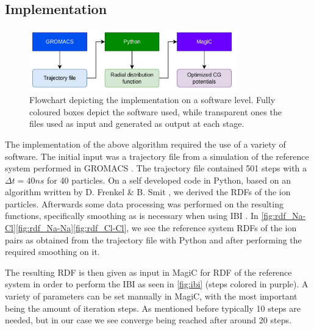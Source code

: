 \documentclass[10pt]{article}
\begin{document}
        
        
    \subsection{Implementation}
        \label{implementation}

                \begin{figure}[H]
                    \centering
                    \includegraphics[width= 0.8\textwidth]{Implementation_hori.jpg}
                    \caption{Flowchart depicting the implementation on a software level. Fully coloured boxes depict the software used, while transparent ones the files used as input and generated as output at each stage.}
                    \label{fig:implem_flowchart}
                \end{figure}
                
                The implementation of the above algorithm required the use of a variety of software. The initial input was a trajectory file from a simulation of the reference system performed in GROMACS \cite{Gromacs}. The trajectory file contained 501 steps with a $\Delta t = 40 ns$ for 40 particles. On a self developed code in Python, based on an algorithm written by D. Frenkel \& B. Smit \cite{Frenkel}, we derived the RDFs of the ion particles. Afterwards some data processing was performed on the resulting functions, specifically smoothing as is necessary when using IBI \cite{Ruhle}. In \ref{fig:rdf_Na-Cl}\ref{fig:rdf_Na-Na}\ref{fig:rdf_Cl-Cl}, we see the reference system RDFs of the ion pairs as obtained from the trajectory file with Python and after performing the required smoothing on it.

                The resulting RDF is then given as input in MagiC \cite{Magic} for RDF of the reference system in order to perform the IBI as seen in \ref{fig:ibi} (steps colored in purple). A variety of parameters can be set manually in MagiC, with the most important being the amount of iteration steps. As mentioned before typically 10 steps are needed, but in our case we see converge being reached after around 20 steps.
\end{document}
